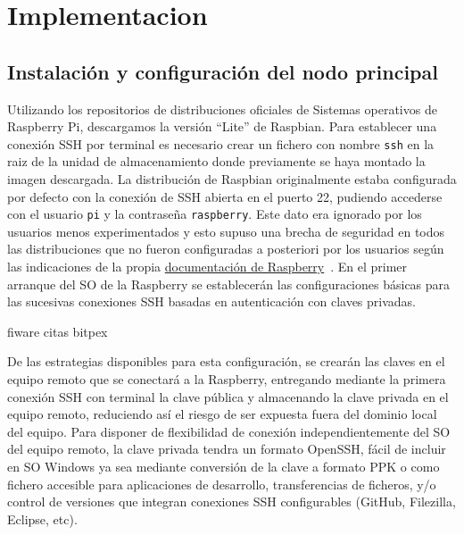 \cleardoublepage

\chapter{Implementacion}
\label{makereference5}



\section{Instalación y configuración del nodo principal}
\label{makereference5.1}
 Utilizando los repositorios de distribuciones oficiales de Sistemas operativos de Raspberry Pi, descargamos la versión ``Lite'' de Raspbian. Para establecer una conexión SSH por terminal es necesario crear un fichero con nombre \verb|ssh| en la raiz de la unidad de almacenamiento donde previamente se haya montado la imagen descargada. La distribución de Raspbian originalmente estaba configurada por defecto con la conexión de SSH abierta en el puerto 22, pudiendo accederse con el usuario \verb|pi| y la contraseña \verb|raspberry|. Este dato era ignorado por los usuarios menos experimentados y esto supuso una brecha de seguridad en todos las distribuciones que no fueron configuradas a posteriori por los usuarios según las indicaciones de la propia \href{https://www.raspberrypi.org/documentation/configuration/security.md}{documentación de Raspberry}~\cite{securingyourraspberrypi}. En el primer arranque del SO de la Raspberry se establecerán las configuraciones básicas para las sucesivas conexiones SSH basadas en autenticación con claves privadas.

 fiware citas bitpex

 De las estrategias disponibles para esta configuración, se crearán las claves en el equipo remoto que se conectará a la Raspberry, entregando mediante la primera conexión SSH con terminal la clave pública y almacenando la clave privada en el equipo remoto, reduciendo así el riesgo de ser expuesta fuera del dominio local del equipo. Para disponer de flexibilidad de conexión independientemente del SO del equipo remoto, la clave privada tendra un formato OpenSSH, fácil de incluir en SO Windows ya sea mediante conversión de la clave a formato PPK o como fichero accesible para aplicaciones de desarrollo, transferencias de ficheros, y/o control de versiones que integran conexiones SSH configurables (GitHub, Filezilla, Eclipse, etc).

